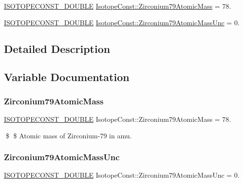 \begin{DoxyCompactItemize}
\item 
\mbox{\hyperlink{group___isotope_const-_macros_ga8f45a7272ce02c0b4c65c44636ed719a}{I\+S\+O\+T\+O\+P\+E\+C\+O\+N\+S\+T\+\_\+\+D\+O\+U\+B\+LE}} \mbox{\hyperlink{group___isotope_const-_zirconium-_zr79_gaf7bff58f14cdd0effb11cfd9f8cfa839}{Isotope\+Const\+::\+Zirconium79\+Atomic\+Mass}} = 78.
\item 
\mbox{\hyperlink{group___isotope_const-_macros_ga8f45a7272ce02c0b4c65c44636ed719a}{I\+S\+O\+T\+O\+P\+E\+C\+O\+N\+S\+T\+\_\+\+D\+O\+U\+B\+LE}} \mbox{\hyperlink{group___isotope_const-_zirconium-_zr79_ga1a47af650d79cbd71f47715bf2cb0347}{Isotope\+Const\+::\+Zirconium79\+Atomic\+Mass\+Unc}} = 0.
\end{DoxyCompactItemize}


\subsection{Detailed Description}


\subsection{Variable Documentation}
\mbox{\label{group___isotope_const-_zirconium-_zr79_gaf7bff58f14cdd0effb11cfd9f8cfa839}} 
\subsubsection{\texorpdfstring{Zirconium79\+Atomic\+Mass}{Zirconium79AtomicMass}}
{\footnotesize\ttfamily \mbox{\hyperlink{group___isotope_const-_macros_ga8f45a7272ce02c0b4c65c44636ed719a}{I\+S\+O\+T\+O\+P\+E\+C\+O\+N\+S\+T\+\_\+\+D\+O\+U\+B\+LE}} Isotope\+Const\+::\+Zirconium79\+Atomic\+Mass = 78.}

\$ \$ Atomic mass of Zirconium-\/79 in amu. \mbox{\label{group___isotope_const-_zirconium-_zr79_ga1a47af650d79cbd71f47715bf2cb0347}} 
\subsubsection{\texorpdfstring{Zirconium79\+Atomic\+Mass\+Unc}{Zirconium79AtomicMassUnc}}
{\footnotesize\ttfamily \mbox{\hyperlink{group___isotope_const-_macros_ga8f45a7272ce02c0b4c65c44636ed719a}{I\+S\+O\+T\+O\+P\+E\+C\+O\+N\+S\+T\+\_\+\+D\+O\+U\+B\+LE}} Isotope\+Const\+::\+Zirconium79\+Atomic\+Mass\+Unc = 0.}

